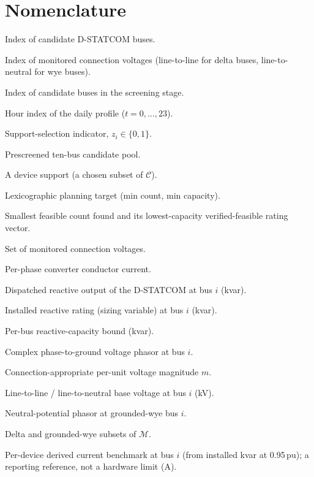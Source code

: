 \documentclass{ieeeaccess}
\newcommand{\SI}[2]{#1\,\ensuremath{\mathrm{#2}}}
\newcommand{\Qmax}{Q^{\max}}
\newcommand{\Iben}{I^{\mathrm{ben}}}
\begin{document}
\section*{Nomenclature}
\begin{IEEEdescription}[\IEEEsetlabelwidth{$P^0_{L,k},Q^0_{L,k}$~}]
\item[$i$] Index of candidate D-STATCOM buses.
\item[$m$] Index of monitored connection voltages (line-to-line for
delta buses, line-to-neutral for wye buses).
\item[$b$] Index of candidate buses in the screening stage.
\item[$t$] Hour index of the daily profile \mbox{($t=0,\dots,23$)}.
\item[$z_i$] Support-selection indicator, $z_i\in\{0,1\}$.
\item[$\mathcal C$] Prescreened ten-bus candidate pool.
\item[$\mathcal S$] A device support (a chosen subset of $\mathcal C$).
\item[$n_{\min},Q^\ast$] Lexicographic planning target (min count, min capacity).
\item[$\hat n,\hat{\mathbf Q}$] Smallest feasible count found and its lowest-capacity verified-feasible rating vector.
\item[$\mathcal M$] Set of monitored connection voltages.
\item[$\underline I_{i,\phi}$] Per-phase converter conductor current.
\item[$Q_i(t)$] Dispatched reactive output of the \mbox{D-STATCOM} at bus $i$ (kvar).
\item[$\Qmax_i$] Installed reactive rating (sizing variable) at bus $i$ (kvar).
\item[$\bar Q_i$] Per-bus reactive-capacity bound (kvar).
\item[$\underline V_{i,\phi}$] Complex phase-to-ground voltage phasor at bus $i$.
\item[$v_m$] Connection-appropriate per-unit voltage magnitude $m$.
\item[$V_{LL,i},V_{LN,i}$] Line-to-line / line-to-neutral base voltage at bus $i$ (kV).
\item[$\underline V_{i,n}$] Neutral-potential phasor at grounded-wye bus $i$.
\item[$\mathcal M_\Delta,\mathcal M_Y$] Delta and grounded-wye subsets of $\mathcal M$.
\item[$\Iben_i$] Per-device derived current benchmark at bus $i$ (from installed kvar at \SI{0.95}{pu}); a reporting reference, not a hardware limit (A).

\end{IEEEdescription}
\end{document}
